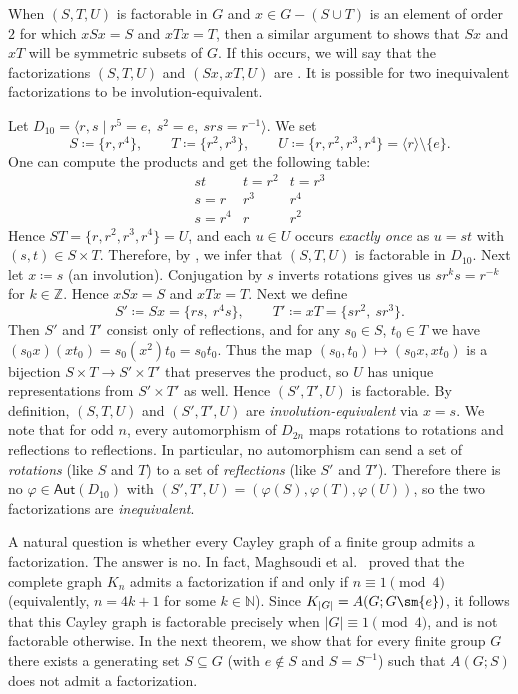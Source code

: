 \documentclass{file}
\newcommand{\Aut}{\mathsf{Aut}}
\begin{document}
When $(S,T,U)$ is factorable in $G$ and $x \in G - (S \cup T)$ is an element of order $2$ for which $xSx=S$ and $xTx=T$, then a similar argument to  shows that $Sx$ and $xT$ will be symmetric subsets of $G$.  If this occurs, we will say that the factorizations $(S,T,U)$ and $(Sx,xT,U)$ are .  It is possible for two inequivalent factorizations to be involution-equivalent.  

\begin{exa}
Let $D_{10}=\langle r,s \mid r^{5}=e,\ s^{2}=e,\ srs=r^{-1}\rangle$.
We set
\[
S\coloneqq \{r,r^{4}\},\qquad T\coloneqq \{r^{2},r^{3}\},\qquad
U\coloneqq \{r,r^{2},r^{3},r^{4}\}=\langle r\rangle\setminus\{e\}.
\]
One can compute the products and get the following table:
\[
\begin{array}{c|cc}
st & t=r^{2} & t=r^{3}\\ \hline
s=r & r^{3} & r^{4}\\
s=r^{4} & r & r^{2}
\end{array}
\]
Hence $ST=\{r,r^{2},r^{3},r^{4}\}=U$, and each $u\in U$ occurs \emph{exactly once} as $u=st$ with
$(s,t)\in S\times T$. Therefore, by ,
we infer that $(S,T,U)$ is factorable in $D_{10}$.
Next let $x\coloneqq  s$ (an involution). Conjugation by $s$ inverts rotations gives us
$s r^{k} s=r^{-k}$ for $k\in\mathbb Z$.
Hence $xSx=S$ and $xTx=T$.
Next we define
\[
S'\coloneqq Sx=\{rs,\ r^{4}s\},\qquad T'\coloneqq xT=\{sr^{2},\ sr^{3}\}.
\]
Then $S'$ and $T'$ consist only of reflections, and for any $s_0\in S$, $t_0\in T$ we have $(s_0x)(xt_0)=s_0(x^{2})t_0=s_0t_0$.
Thus the map $(s_0,t_0)\mapsto (s_0x,xt_0)$ is a bijection $S\times T\to S'\times T'$ that preserves
the product, so $U$ has unique representations from $S'\times T'$ as well. Hence $(S',T',U)$ is factorable. By definition, $(S,T,U)$ and $(S',T',U)$ are
\emph{involution-equivalent} via $x=s$.
We note that for odd $n$, every automorphism of $D_{2n}$ maps rotations to rotations and reflections to reflections. In particular, no automorphism can send a set of
\emph{rotations} (like $S$ and $T$) to a set of \emph{reflections} (like $S'$ and $T'$).
Therefore there is no $\varphi\in\Aut(D_{10})$ with $(S',T',U)=(\varphi(S),\varphi(T),\varphi(U))$,
so the two factorizations are \emph{inequivalent}.
\end{exa}



A natural question is whether every Cayley graph of a finite group admits a factorization.
The answer is no. In fact, Maghsoudi et al.~\cite{maghsoudi2023matrix} proved that the complete
graph $K_n$ admits a factorization if and only if $n \equiv 1 \pmod{4}$ (equivalently, $n=4k+1$ for some $k\in\mathbb{N}$).
Since $K_{|G|} = A(G; G\sm\{e\})$, it follows that this Cayley graph is factorable precisely when
$|G|\equiv 1 \pmod{4}$, and is not factorable otherwise.
In the next theorem, we show that for every finite group $G$ there exists a generating set $S\subseteq G$
(with $e\notin S$ and $S=S^{-1}$) such that $A(G;S)$ does not admit a factorization.
\end{document}
